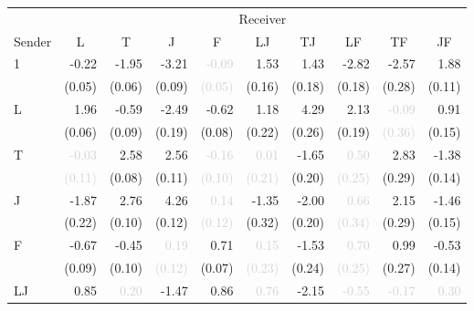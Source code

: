 \begin{tabular}{lrrrrrrrrr}
\toprule
& \multicolumn{9}{c}{Receiver} \\
\cmidrule(l){2-10} 
Sender & \multicolumn{1}{c}{L} & \multicolumn{1}{c}{T} & \multicolumn{1}{c}{J} & \multicolumn{1}{c}{F} & \multicolumn{1}{c}{LJ} & \multicolumn{1}{c}{TJ} & \multicolumn{1}{c}{LF} & \multicolumn{1}{c}{TF} & \multicolumn{1}{c}{JF} \\
\midrule
\multirow{2}{*}{1} &-0.22 &-1.95 &-3.21 &\textcolor{LightGray}{-0.09} &1.53 &1.43 &-2.82 &-2.57 &1.88\\
 &\tiny{(0.05)} &\tiny{(0.06)} &\tiny{(0.09)} &\textcolor{LightGray}{\tiny{(0.05)}} &\tiny{(0.16)} &\tiny{(0.18)} &\tiny{(0.18)} &\tiny{(0.28)} &\tiny{(0.11)}\\[1ex]
\multirow{2}{*}{L} &\cellcolor{Gray}1.96 &-0.59 &-2.49 &-0.62 &1.18 &4.29 &2.13 &\textcolor{LightGray}{-0.09} &0.91\\
 &\cellcolor{Gray}\tiny{(0.06)} &\tiny{(0.09)} &\tiny{(0.19)} &\tiny{(0.08)} &\tiny{(0.22)} &\tiny{(0.26)} &\tiny{(0.19)} &\textcolor{LightGray}{\tiny{(0.36)}} &\tiny{(0.15)}\\[1ex]
\multirow{2}{*}{T} &\textcolor{LightGray}{-0.03} &\cellcolor{Gray}2.58 &2.56 &\textcolor{LightGray}{-0.16} &\textcolor{LightGray}{0.01} &-1.65 &\textcolor{LightGray}{0.50} &2.83 &-1.38\\
 &\textcolor{LightGray}{\tiny{(0.11)}} &\cellcolor{Gray}\tiny{(0.08)} &\tiny{(0.11)} &\textcolor{LightGray}{\tiny{(0.10)}} &\textcolor{LightGray}{\tiny{(0.21)}} &\tiny{(0.20)} &\textcolor{LightGray}{\tiny{(0.25)}} &\tiny{(0.29)} &\tiny{(0.14)}\\[1ex]
\multirow{2}{*}{J} &-1.87 &2.76 &\cellcolor{Gray}4.26 &\textcolor{LightGray}{0.14} &-1.35 &-2.00 &\textcolor{LightGray}{0.66} &2.15 &-1.46\\
 &\tiny{(0.22)} &\tiny{(0.10)} &\cellcolor{Gray}\tiny{(0.12)} &\textcolor{LightGray}{\tiny{(0.12)}} &\tiny{(0.32)} &\tiny{(0.20)} &\textcolor{LightGray}{\tiny{(0.34)}} &\tiny{(0.29)} &\tiny{(0.15)}\\[1ex]
\multirow{2}{*}{F} &-0.67 &-0.45 &\textcolor{LightGray}{0.19} &\cellcolor{Gray}0.71 &\textcolor{LightGray}{0.15} &-1.53 &\textcolor{LightGray}{0.70} &0.99 &-0.53\\
 &\tiny{(0.09)} &\tiny{(0.10)} &\textcolor{LightGray}{\tiny{(0.12)}} &\cellcolor{Gray}\tiny{(0.07)} &\textcolor{LightGray}{\tiny{(0.23)}} &\tiny{(0.24)} &\textcolor{LightGray}{\tiny{(0.25)}} &\tiny{(0.27)} &\tiny{(0.14)}\\[1ex]
\multirow{2}{*}{LJ} &0.85 &\textcolor{LightGray}{0.20} &-1.47 &0.86 &\cellcolor{Gray}\textcolor{LightGray}{0.76} &-2.15 &\textcolor{LightGray}{-0.55} &\textcolor{LightGray}{-0.17} &\textcolor{LightGray}{0.30}\\

\end{tabular}
